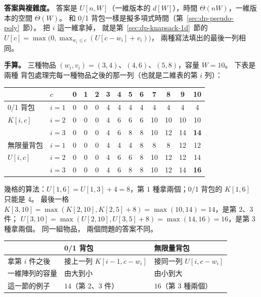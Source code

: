 \textbf{答案與複雜度。} 答案是 $U[n, W]$（一維版本的 $d[W]$），時間 $\Theta(nW)$，一維版本的空間
$\Theta(W)$。 和 0/1 背包一樣是擬多項式時間（第~\ref{sec:dp-pseudo-poly}~節）。 把 $i$ 這一維拿掉，
就是第~\ref{sec:dp-knapsack-1d}~節的 $U[c] = \max\bigl(0, \max_{w_i \le c}(U[c - w_i] + v_i)\bigr)$，
兩種寫法填出的最後一列相同。

\textbf{手算。} 三種物品 $(w_i, v_i) = (3, 4)$、$(4, 6)$、$(5, 8)$，容量 $W = 10$。 下表是兩種
背包處理完每一種物品之後的那一列（也就是二維表的第 $i$ 列）：

\begin{center}
\small
\begin{tabular}{ll*{11}{c}}
\toprule
& $c$ & 0 & 1 & 2 & 3 & 4 & 5 & 6 & 7 & 8 & 9 & 10 \\
\midrule
0/1 背包 & $i = 1$ & 0 & 0 & 0 & 4 & 4 & 4 & 4 & 4 & 4 & 4 & 4 \\
$K[i, c]$ & $i = 2$ & 0 & 0 & 0 & 4 & 6 & 6 & 6 & 10 & 10 & 10 & 10 \\
& $i = 3$ & 0 & 0 & 0 & 4 & 6 & 8 & 8 & 10 & 12 & 14 & \textbf{14} \\
\midrule
無限量背包 & $i = 1$ & 0 & 0 & 0 & 4 & 4 & 4 & 8 & 8 & 8 & 12 & 12 \\
$U[i, c]$ & $i = 2$ & 0 & 0 & 0 & 4 & 6 & 6 & 8 & 10 & 12 & 12 & 14 \\
& $i = 3$ & 0 & 0 & 0 & 4 & 6 & 8 & 8 & 10 & 12 & 14 & \textbf{16} \\
\bottomrule
\end{tabular}
\end{center}

幾格的算法：$U[1, 6] = U[1, 3] + 4 = 8$，第 $1$ 種拿兩個；0/1 背包的 $K[1, 6]$ 只能是 $4$。
最後一格 $K[3, 10] = \max(K[2, 10], K[2, 5] + 8) = \max(10, 14) = 14$，是第 $2$、$3$ 件；
$U[3, 10] = \max(U[2, 10], U[3, 5] + 8) = \max(14, 16) = 16$，是第 $3$ 種拿兩個。 同一組物品，
兩個問題的答案不同。

\begin{center}
\small
\begin{tabular}{lll}
\toprule
& 0/1 背包 & 無限量背包 \\
\midrule
拿第 $i$ 件之後 & 接上一列 $K[i - 1, c - w_i]$ & 接同一列 $U[i, c - w_i]$ \\
一維陣列的容量 & 由大到小 & 由小到大 \\
這一節的例子 & $14$（第 $2$、$3$ 件） & $16$（第 $3$ 種兩個） \\
\bottomrule
\end{tabular}
\end{center}

